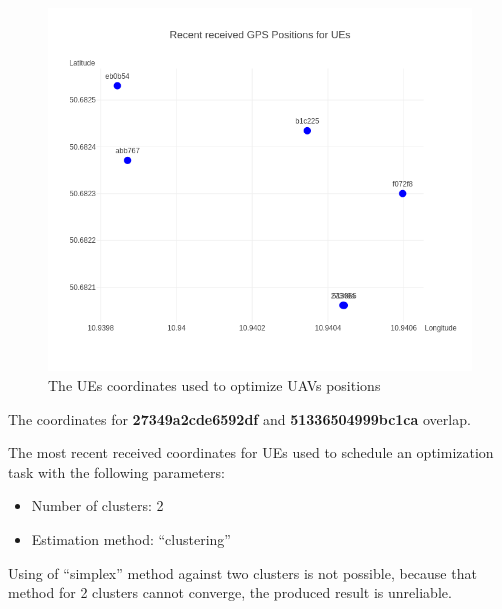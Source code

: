\begin{figure}[H]
	\centering
	\includegraphics[width=\linewidth,keepaspectratio]{images/Exp4_UEs_Location_to_optimize.png}
\caption{The UEs coordinates used to optimize UAVs positions}
\end{figure}

The coordinates for \textbf{27349a2cde6592df} and
\textbf{51336504999bc1ca} overlap.

The most recent received coordinates for UEs used to schedule an
optimization task with the following parameters:

\begin{itemize}
\tightlist
\item
  Number of clusters: 2
\item
  Estimation method: ``clustering''
\end{itemize}

Using of ``simplex'' method against two clusters is not possible,
because that method for 2 clusters cannot converge, the produced result
is unreliable.


